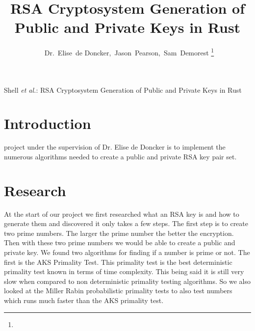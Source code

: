 \documentclass[12pt,journal,compsoc]{IEEEtran}
\begin{document}
\lstset{language=bash}
%
\title{RSA Cryptosystem Generation of Public and Private Keys in Rust}
\author{~Dr.~Elise~de Doncker,~Jason~Pearson,~Sam~Demorest%
\thanks{}}

\markboth{}%
{Shell \MakeLowercase{\textit{et al.}}: RSA Cryptosystem Generation of Public and Private Keys in Rust}





\maketitle

\IEEEdisplaynotcompsoctitleabstractindextext
\IEEEpeerreviewmaketitle



\section{Introduction}
 project under the supervision of Dr. Elise de Doncker is to implement the numerous algorithms needed to create a public and private RSA key pair set. 


\section{Research}
At the start of our project we first researched what an RSA key is and how to generate them and discovered it only takes a few steps. The first step is to create two prime numbers. The larger the prime number the better the encryption. Then with these two prime numbers we would be able to create a public and private key. 
\newline \indent We found two algorithms for finding if a number is prime or not. The first is the AKS Primality Test. This primality test is the best deterministic primality test known in terms of time complexity. This being said it is still very slow when compared to non deterministic primality testing algorithms. So we also looked at the Miller Rabin probabilistic primality tests to also test numbers which runs much faster than the AKS primality test.
\end{document}
